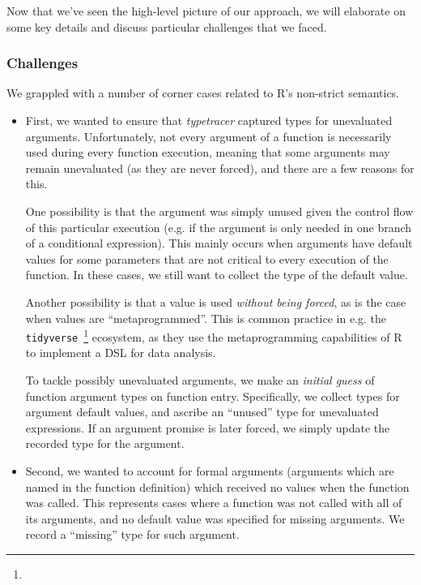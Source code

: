 \documentclass[acmsmall,review,anonymous]{acmart}\settopmatter{printfolios=true,printccs=false,printacmref=false}
\newcommand{\code}[1]{{\lstinline[style=Rin]!#1!}\xspace}
\newcommand{\typetracer}{\emph{typetracer}\xspace} %
\begin{document}
Now that we've seen the high-level picture of our approach, we will elaborate on some key details and discuss particular challenges that we faced.

%
%
\subsubsection{Challenges}
\label{subsec:typetracer-challenges}

We grappled with a number of corner cases related to R's non-strict semantics.

\begin{itemize}

\item First, we wanted to ensure that \typetracer captured types for
  unevaluated arguments.  Unfortunately, not every argument of a function is
  necessarily used during every function execution, meaning that some
  arguments may remain unevaluated (as they are never forced), and there are
  a few reasons for this.

  One possibility is that the argument was simply unused given the control
  flow of this particular execution (e.g. if the argument is only needed in
  one branch of a conditional expression).  This mainly occurs when
  arguments have default values for some parameters that are not critical to
  every execution of the function.  In these cases, we still want to collect
  the type of the default value.

Another possibility is that a value is used {\it without being forced}, as
is the case when values are ``metaprogrammed''.
This is common practice in e.g. the \code{tidyverse}~\footnote{} ecosystem, as they use the metaprogramming capabilities of R to implement a DSL for data analysis.


To tackle possibly unevaluated arguments, we make an {\it initial guess} of
function argument types on function entry. Specifically, we collect types
for argument default values, and ascribe an ``unused'' type for unevaluated
expressions.  If an argument promise is later forced, we simply update the
recorded type for the argument.

\item Second, we wanted to account for formal arguments (arguments which are
  named in the function definition) which received no values when the
  function was called. This represents cases where a function was not called
  with all of its arguments, and no default value was specified for missing
  arguments.  We record a ``missing'' type for such argument.


\end{itemize}
\end{document}
